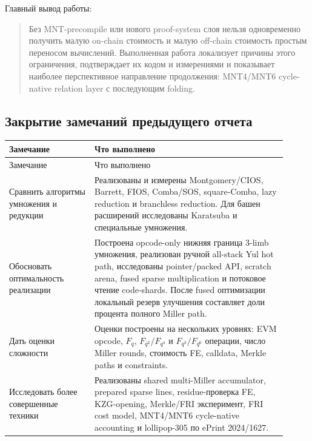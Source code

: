 \documentclass[12pt,a4paper]{article}
\begin{document}
Главный вывод работы:
\begin{quote}
Без MNT-precompile или нового proof-system слоя нельзя одновременно получить
малую on-chain стоимость и малую off-chain стоимость простым переносом
вычислений. Выполненная работа локализует причины этого ограничения,
подтверждает их кодом и измерениями и показывает наиболее перспективное
направление продолжения: MNT4/MNT6 cycle-native relation layer с последующим
folding.
\end{quote}

\subsection{Закрытие замечаний предыдущего отчета}

\begin{longtable}{p{0.28\linewidth}p{0.63\linewidth}}
\\
\toprule
Замечание & Что выполнено \\
\midrule
\endfirsthead
\toprule
Замечание & Что выполнено \\
\midrule
\endhead
Сравнить алгоритмы умножения и редукции &
Реализованы и измерены Montgomery/CIOS, Barrett, FIOS, Comba/SOS,
square-Comba, lazy reduction и branchless reduction. Для башен расширений
исследованы Karatsuba и специальные умножения. \\
\addlinespace
Обосновать оптимальность реализации &
Построена opcode-only нижняя граница 3-limb умножения, реализован ручной
all-stack Yul hot path, исследованы pointer/packed API, scratch arena,
fused sparse multiplication и потоковое чтение code-shards. После fused
оптимизации локальный резерв улучшения составляет доли процента полного
Miller path. \\
\addlinespace
Дать оценки сложности &
Оценки построены на нескольких уровнях: EVM opcode, $F_q$,
$F_{q^2}/F_{q^4}$ и $F_{q^3}/F_{q^6}$ операции, число Miller rounds,
стоимость FE, calldata, Merkle paths и constraints.  \\
\addlinespace
Исследовать более совершенные техники &
Реализованы shared multi-Miller accumulator, prepared sparse lines,
residue-проверка FE, KZG-opening, Merkle/FRI эксперимент, FRI cost model, MNT4/MNT6 cycle-native accounting и lollipop-305 по ePrint 2024/1627. \\
\bottomrule
\end{longtable}
\end{document}
